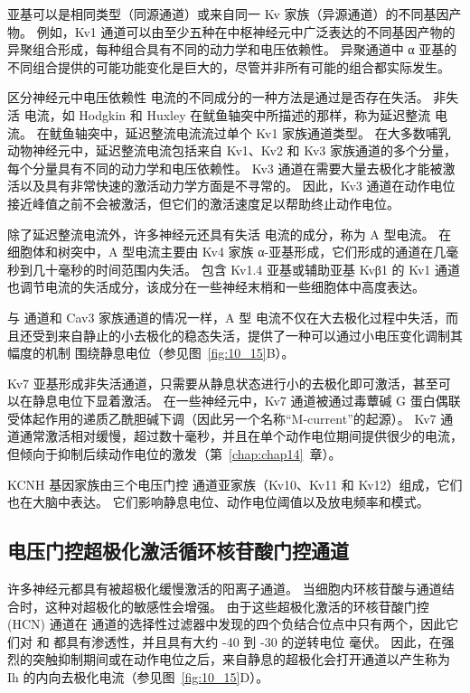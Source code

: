 亚基可以是相同类型（同源通道）或来自同一 Kv 家族（异源通道）的不同基因产物。
例如，Kv1 通道可以由至少五种在中枢神经元中广泛表达的不同基因产物的异聚组合形成，每种组合具有不同的动力学和电压依赖性。
异聚通道中 α 亚基的不同组合提供的可能功能变化是巨大的，尽管并非所有可能的组合都实际发生。


区分神经元中电压依赖性  电流的不同成分的一种方法是通过是否存在失活。
非失活  电流，如 Hodgkin 和 Huxley 在鱿鱼轴突中所描述的那样，称为延迟整流  电流。
在鱿鱼轴突中，延迟整流电流流过单个 Kv1 家族通道类型。
在大多数哺乳动物神经元中，延迟整流电流包括来自 Kv1、Kv2 和 Kv3 家族通道的多个分量，每个分量具有不同的动力学和电压依赖性。
Kv3 通道在需要大量去极化才能被激活以及具有非常快速的激活动力学方面是不寻常的。
因此，Kv3 通道在动作电位接近峰值之前不会被激活，但它们的激活速度足以帮助终止动作电位。


除了延迟整流电流外，许多神经元还具有失活  电流的成分，称为 A 型电流。
在细胞体和树突中，A 型电流主要由 Kv4 家族 α-亚基形成，它们形成的通道在几毫秒到几十毫秒的时间范围内失活。
包含 Kv1.4 亚基或辅助亚基 Kvβ1 的 Kv1 通道也调节电流的失活成分，该成分在一些神经末梢和一些细胞体中高度表达。


与  通道和 Cav3 家族通道的情况一样，A 型  电流不仅在大去极化过程中失活，而且还受到来自静止的小去极化的稳态失活，提供了一种可以通过小电压变化调制其幅度的机制 围绕静息电位（参见图~\ref{fig:10_15}B）。

Kv7 亚基形成非失活通道，只需要从静息状态进行小的去极化即可激活，甚至可以在静息电位下显着激活。
在一些神经元中，Kv7 通道被通过毒蕈碱 G 蛋白偶联受体起作用的递质乙酰胆碱下调（因此另一个名称“M-current”的起源）。
Kv7 通道通常激活相对缓慢，超过数十毫秒，并且在单个动作电位期间提供很少的电流，但倾向于抑制后续动作电位的激发（第~\ref{chap:chap14}~章）。


KCNH 基因家族由三个电压门控  通道亚家族（Kv10、Kv11 和 Kv12）组成，它们也在大脑中表达。
它们影响静息电位、动作电位阈值以及放电频率和模式。



\subsection{电压门控超极化激活循环核苷酸门控通道}

许多神经元都具有被超极化缓慢激活的阳离子通道。
当细胞内环核苷酸与通道结合时，这种对超极化的敏感性会增强。
由于这些超极化激活的环核苷酸门控 (HCN) 通道在  通道的选择性过滤器中发现的四个负结合位点中只有两个，因此它们对  和  都具有渗透性，并且具有大约 -40 到 -30 的逆转电位 毫伏。
因此，在强烈的突触抑制期间或在动作电位之后，来自静息的超极化会打开通道以产生称为 Ih 的内向去极化电流（参见图~\ref{fig:10_15}D）。



